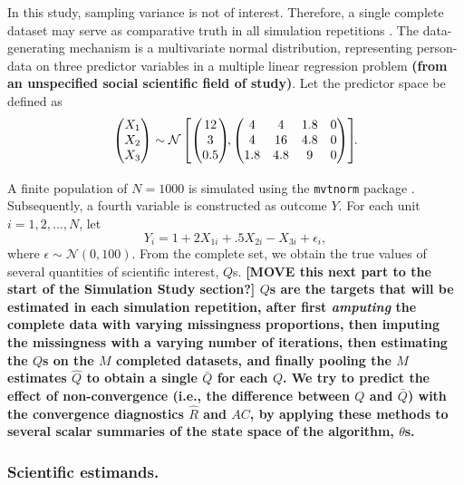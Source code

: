\documentclass[Royal,times,sageh]{sagej}
\begin{document}
In this study, sampling variance is not of interest. Therefore, a single complete dataset may serve as comparative truth in all simulation repetitions \citep{vink14}. The data-generating mechanism is a multivariate normal distribution, representing person-data on three predictor variables in a multiple linear regression problem \textbf{(from an unspecified social scientific field of study)}. Let the predictor space be defined as
\[
\begin{aligned}
\begin{pmatrix}X_1\\
X_2\\
X_3
\end{pmatrix} \sim \mathcal{N}
\begin{bmatrix}
\begin{pmatrix}
12\\
3\\
0.5
\end{pmatrix}\!\!,
\begin{pmatrix}
4 & 4 & 1.8 & 0\\
4 & 16 & 4.8 & 0\\
1.8 & 4.8 & 9 & 0
\end{pmatrix}
\end{bmatrix}\!\!\text{.}\\[2\jot]
\end{aligned}
\]
A finite population of \(N=1000\) is simulated using the \texttt{mvtnorm} package \citep{mvtnorm}. Subsequently, a fourth variable is constructed as outcome \(Y\). For each unit \(i = 1, 2,..., N\), let
\[
Y_i = 1 + 2X_{1i} +.5X_{2i} - X_{3i} + \epsilon_i ,
\]
where \(\epsilon \sim \mathcal{N}(0, 100)\). From the complete set, we obtain the true values of several quantities of scientific interest, \(Q\)s. \textbf{{[}MOVE this next part to the start of the Simulation Study section?{]} \(Q\)s are the targets that will be estimated in each simulation repetition, after first \emph{amputing} the complete data with varying missingness proportions, then imputing the missingness with a varying number of iterations, then estimating the \(Q\)s on the \(M\) completed datasets, and finally pooling the \(M\) estimates \(\hat{Q}\) to obtain a single \(\bar{Q}\) for each \(Q\). We try to predict the effect of non-convergence (i.e., the difference between \(Q\) and \(\bar{Q}\)) with the convergence diagnostics \(\widehat{R}\) and \(AC\), by applying these methods to several scalar summaries of the state space of the algorithm, \(\theta\)s.}

\hypertarget{scientific-estimands.}{%
\subsubsection{Scientific estimands.}\label{scientific-estimands.}}
\end{document}
